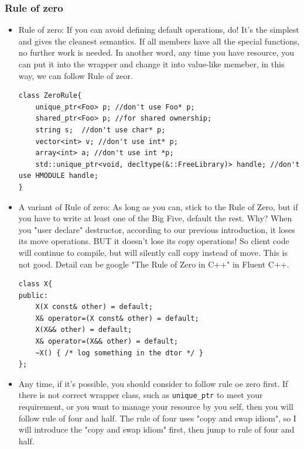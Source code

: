\documentclass[a4paper,11pt,twoside]{book}
\begin{document}
\subsubsection{Rule of zero}
\begin{itemize}
    \item Rule of zero: If you can avoid defining default operations, do! It’s the simplest and gives the cleanest semantics. If all members have all the special functions, no further work is needed. In another word, any time you have resource, you can put it into the wrapper and change it into value-like memeber, in this way, we can follow Rule of zeor.

\begin{lstlisting}
class ZeroRule{
	unique_ptr<Foo> p; //don't use Foo* p;
	shared_ptr<Foo> p; //for shared ownership;
	string s;  //don't use char* p;
	vector<int> v; //don't use int* p;
	array<int> a; //don't use int *p;
	std::unique_ptr<void, decltype(&::FreeLibrary)> handle; //don't use HMODULE handle;
}	
\end{lstlisting}

	\item A variant of Rule of zero: As long as you can, stick to the Rule of Zero, but if you have to write at least one of the Big Five, default the rest. Why?  When you "user declare" destructor, according to our previous introduction, it loses its move operations. BUT it doesn’t lose its copy operations! So client code will continue to compile, but will silently call copy instead of move. This is not good. Detail can be google "The Rule of Zero in C++" in Fluent C++.
	 
\begin{lstlisting}
class X{
public:
	X(X const& other) = default;
	X& operator=(X const& other) = default;	
	X(X&& other) = default;
	X& operator=(X&& other) = default;
	~X() { /* log something in the dtor */ }
};
\end{lstlisting}

   
    \item Any time, if it's possible, you should consider to follow rule oe zero first. If there is not correct wrapper class, such as \texttt{unique\_ptr} to meet your requirement, or you want to manage your resource by you self, then you will follow rule of four and half. The rule of four uses "copy and swap idiom", so I will introduce the "copy and swap idiom" first, then jump to rule of four and half.

\end{itemize}
\end{document}
